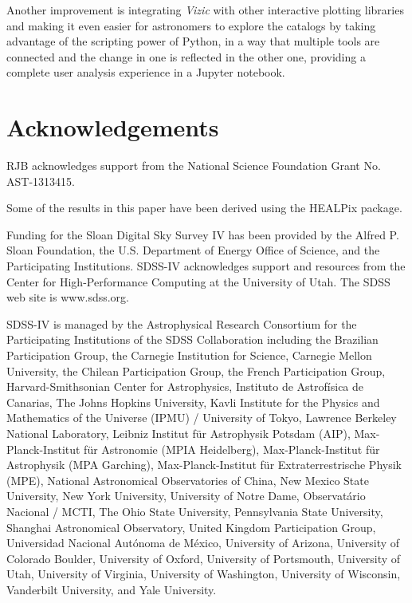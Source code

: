 \documentclass[5p,authoryear]{elsarticle}
\begin{document}
Another improvement is integrating \textit{Vizic} with other interactive plotting libraries and making it even easier for astronomers to explore the catalogs by taking advantage of the scripting power of Python, in a way that multiple tools are connected and the change in one is reflected in the other one, providing a complete user analysis experience in a Jupyter notebook.

\section*{Acknowledgements}
RJB acknowledges support from the National Science Foundation Grant No. AST-1313415.

Some of the results in this paper have been derived using the HEALPix \citep{healpix} package.

Funding for the Sloan Digital Sky Survey IV has been provided by
the Alfred P. Sloan Foundation, the U.S. Department of Energy Office of
Science, and the Participating Institutions. SDSS-IV acknowledges
support and resources from the Center for High-Performance Computing at
the University of Utah. The SDSS web site is www.sdss.org.

SDSS-IV is managed by the Astrophysical Research Consortium for the
Participating Institutions of the SDSS Collaboration including the
Brazilian Participation Group, the Carnegie Institution for Science,
Carnegie Mellon University, the Chilean Participation Group, the French Participation Group, Harvard-Smithsonian Center for Astrophysics,
Instituto de Astrof\'isica de Canarias, The Johns Hopkins University,
Kavli Institute for the Physics and Mathematics of the Universe (IPMU) /
University of Tokyo, Lawrence Berkeley National Laboratory,
Leibniz Institut f\"ur Astrophysik Potsdam (AIP),
Max-Planck-Institut f\"ur Astronomie (MPIA Heidelberg),
Max-Planck-Institut f\"ur Astrophysik (MPA Garching),
Max-Planck-Institut f\"ur Extraterrestrische Physik (MPE),
National Astronomical Observatories of China, New Mexico State University,
New York University, University of Notre Dame,
Observat\'ario Nacional / MCTI, The Ohio State University,
Pennsylvania State University, Shanghai Astronomical Observatory,
United Kingdom Participation Group,
Universidad Nacional Aut\'onoma de M\'exico, University of Arizona,
University of Colorado Boulder, University of Oxford, University of Portsmouth,
University of Utah, University of Virginia, University of Washington, University of Wisconsin,
Vanderbilt University, and Yale University.


\nocite{*}


\end{document}

